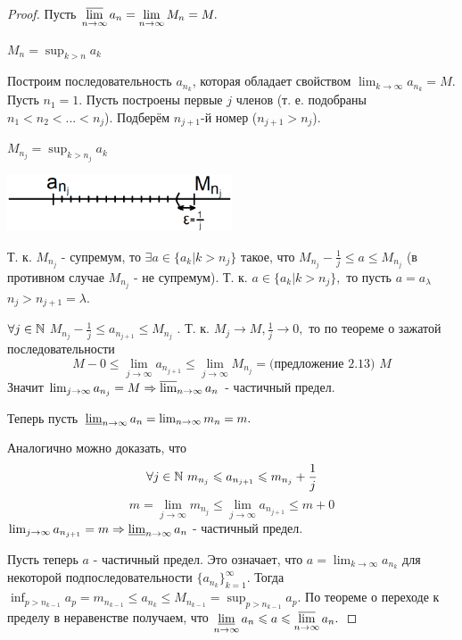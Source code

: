 	\begin{proof}
		Пусть $\displaystyle \operatorname*{\overline{lim}}_{n \to \infty} a_n = \lim_{n \to \infty} M_n = M.$
		
		$M_n = \sup_{k > n} a_k$
		
		Построим последовательность $a_{n_k}$, которая обладает свойством $\lim_{k \to \infty} a_{n_k} = M$. Пусть $n_1 = 1.$ Пусть построены первые $j$ членов (т. е. подобраны $n_1 < n_2 < ... < n_j$). Подберём $n_{j + 1}$-й номер ($n_{j + 1} > n_{j}$).
		
		$M_{n_j} = \sup_{k > n_j} a_k$
		
		\begin{center}
			\includegraphics[width=0.5\textwidth]{img/lecture5/theorem_bolcano}
		\end{center}
		
		Т. к. $M_{n_j}$ - супремум, то $\exists a \in \{a_k | k > n_j\}$ такое, что
		$M_{n_j} - \frac{1}{j} \leqslant a \leqslant M_{n_j}$ (в противном случае $M_{n_j}$ - не супремум). Т. к. $a \in \{a_k | k > n_j\},$ то пусть $a = a_{\lambda}$ $n_j > n_{j + 1} = \lambda.$
		
		$\forall j \in \mathbb N$ $M_{n_j} - \frac{1}{j} \leqslant a_{n_{j + 1}} \leqslant M_{n_j}$ . Т. к. $M_j \to M, \frac{1}{j} \to 0,$ то по теореме о зажатой последовательности
		\[ M - 0 \leqslant \lim_{j \to \infty} a_{n_{j + 1}} \leqslant \lim_{j \to \infty} M_{n_j} = \text{(предложение 2.13) } M \]
		Значит $\lim_{j \to \infty} a_{n_j} = M \Rightarrow \operatorname*{\overline{lim}}_{n \to \infty} a_n$ - частичный предел.
		
		Теперь пусть $\operatorname*{\underline{lim}}_{n \to \infty} a_n = \lim_{n \to \infty} m_n = m.$
		
		Аналогично можно доказать, что
		\[ \forall j \in \mathbb N \text{ } m_{n_j} \leqslant a_{n_{j + 1}} \leqslant m_{n_j} + \frac{1}{j} \]
		\[ m = \lim_{j \to \infty} m_{n_j} \leqslant \lim_{j \to \infty} a_{n_{j + 1}} \leqslant m + 0 \]
		$\lim_{j \to \infty} a_{n_{j + 1}} = m \Rightarrow \operatorname*{\underline{lim}}_{n \to \infty} a_n$ - частичный предел.
		
		Пусть теперь $a$ - частичный предел. Это означает, что $a = \lim_{k \to \infty} a_{n_k}$ для некоторой подпоследовательности $\{a_{n_k}\}^{\infty}_{k = 1}.$ Тогда $\displaystyle \inf_{p > n_{k - 1}} a_p = m_{n_{k - 1}} \leqslant a_{n_k} \leqslant M_{n_{k - 1}} = \sup_{p > n_{k - 1}} a_p.$ По теореме о переходе к пределу в неравенстве получаем, что $\displaystyle \operatorname*{\underline{lim}}_{n \to \infty} a_n \leqslant a \leqslant \operatorname*{\overline{lim}}_{n \to \infty} a_n.$
	\end{proof}
	

